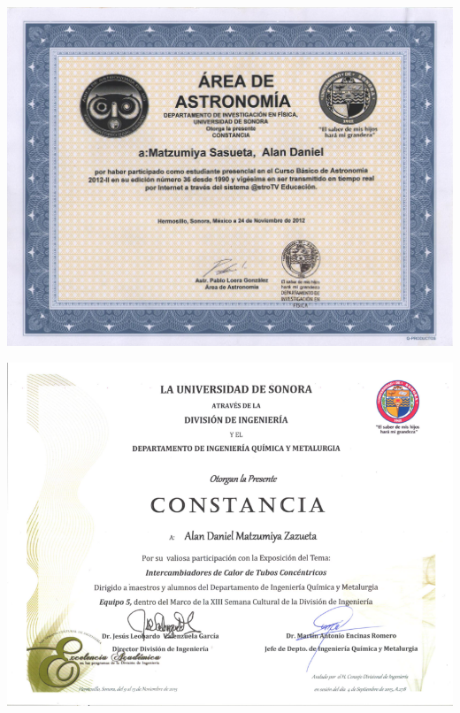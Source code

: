 \colorbox{darkcol}{
\parbox{1.0\linewidth}{
	\colorbox{lightcol}{
		\parbox{0.98\linewidth}{
			\parbox{0.5\linewidth}{
				\includegraphics[width=1.0\linewidth]{../../docs/astronomy.jpeg}
				}
			\parbox{0.5\linewidth}{
				\includegraphics[width=1.0\linewidth]{../../docs/laboratory.png}
				}
			\parbox{0.5\linewidth}{
}}}}}
